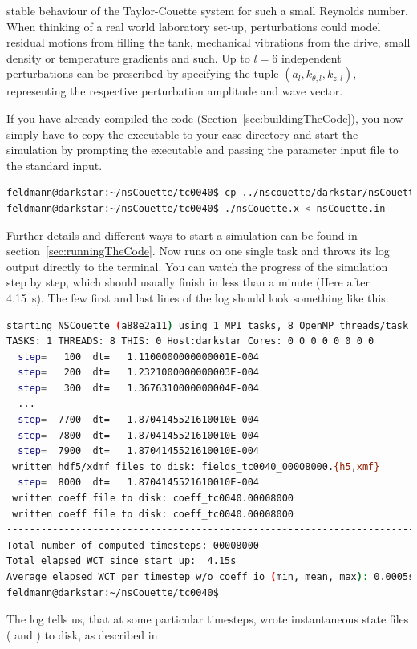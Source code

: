 \documentclass[a4paper, 11pt, DIV=11]{scrartcl}
\begin{document}
stable behaviour of the Taylor-Couette system for such a small Reynolds number.
When thinking of a real world laboratory set-up, perturbations could model residual
motions from filling the tank, mechanical vibrations from the drive, small density
or temperature gradients and such. Up to $l=6$ independent perturbations can be
prescribed by specifying the tuple $(a_l, k_{\theta,l}, k_{z,l})$, representing
the respective perturbation amplitude and wave vector. \par If you have already
compiled the code (Section~\ref{sec:buildingTheCode}), you now simply have to copy
the executable to your case directory and start the simulation by prompting the
executable and passing the parameter input file to the standard input.
\begin{lstlisting}[language=bash]
feldmann@darkstar:~/nsCouette/tc0040$ cp ../nscouette/darkstar/nsCouette.x .
feldmann@darkstar:~/nsCouette/tc0040$ ./nsCouette.x < nsCouette.in
\end{lstlisting}
Further details and different ways to start a simulation can be found in
section~\ref{sec:runningTheCode}. Now \nsc runs on one single \mpi task and
throws its log output directly to the terminal. You can watch the progress
of the simulation step by step, which should usually finish in less than a
minute (Here after \SI{4.15}{\second}). The few first and last lines of the
log should look something like this.
\begin{lstlisting}[language=bash]
starting NSCouette (a88e2a11) using 1 MPI tasks, 8 OpenMP threads/task
TASKS: 1 THREADS: 8 THIS: 0 Host:darkstar Cores: 0 0 0 0 0 0 0 0
  step=   100  dt=   1.1100000000000001E-004
  step=   200  dt=   1.2321000000000003E-004
  step=   300  dt=   1.3676310000000004E-004
  ...
  step=  7700  dt=   1.8704145521610010E-004
  step=  7800  dt=   1.8704145521610010E-004
  step=  7900  dt=   1.8704145521610010E-004
 written hdf5/xdmf files to disk: fields_tc0040_00008000.{h5,xmf}
  step=  8000  dt=   1.8704145521610010E-004
 written coeff file to disk: coeff_tc0040.00008000
 written coeff file to disk: coeff_tc0040.00008000
------------------------------------------------------------------------------------
Total number of computed timesteps: 00008000
Total elapsed WCT since start up:  4.15s
Average elapsed WCT per timestep w/o coeff io (min, mean, max): 0.0005s, 0.0005s, 0.0005s
feldmann@darkstar:~/nsCouette/tc0040$
\end{lstlisting}
The log tells us, that at some particular timesteps, \nsc wrote instantaneous
state files ( and ) to disk, as described in
\end{document}

